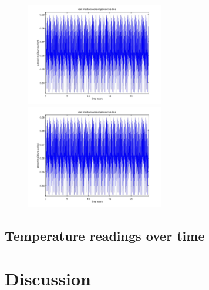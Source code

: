 \documentclass[a4paper,12pt]{article}
\begin{document}
\begin{figure}[ht!]
	\centering
	\includegraphics[width=60mm]{root_moisture_content_1.jpg}
	\includegraphics[width=60mm]{root_moisture_content_1.jpg}
\end{figure}


\subsection{Temperature readings over time}


\section{Discussion}
\end{document}
